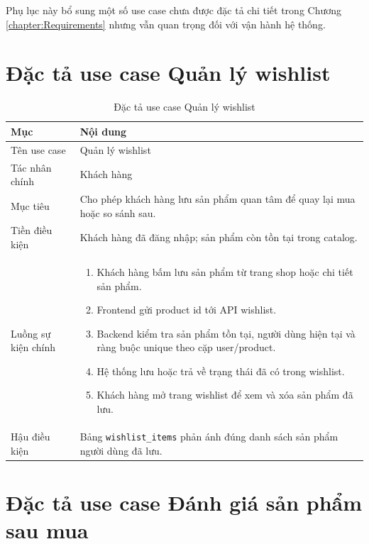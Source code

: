\documentclass[../DoAn.tex]{subfiles}
\begin{document}
Phụ lục này bổ sung một số use case chưa được đặc tả chi tiết trong Chương \ref{chapter:Requirements} nhưng vẫn quan trọng đối với vận hành hệ thống.

\section{Đặc tả use case Quản lý wishlist}
\label{appendix:B.1}

{\normalsize
\setlength{\LTleft}{\fill}
\setlength{\LTright}{\fill}
\setlength{\tabcolsep}{5pt}
\renewcommand{\arraystretch}{1.25}
\begin{longtable}{|p{3.2cm}|p{10.4cm}|}
\caption{Đặc tả use case Quản lý wishlist}\\
\hline
\textbf{Mục} & \textbf{Nội dung} \\ \hline
Tên use case & Quản lý wishlist \\ \hline
Tác nhân chính & Khách hàng \\ \hline
Mục tiêu & Cho phép khách hàng lưu sản phẩm quan tâm để quay lại mua hoặc so sánh sau. \\ \hline
Tiền điều kiện & Khách hàng đã đăng nhập; sản phẩm còn tồn tại trong catalog. \\ \hline
Luồng sự kiện chính &
\begin{minipage}[t]{10.1cm}
\begin{enumerate}[leftmargin=*,topsep=0pt,itemsep=0pt]
    \item Khách hàng bấm lưu sản phẩm từ trang shop hoặc chi tiết sản phẩm.
    \item Frontend gửi product id tới API wishlist.
    \item Backend kiểm tra sản phẩm tồn tại, người dùng hiện tại và ràng buộc unique theo cặp user/product.
    \item Hệ thống lưu hoặc trả về trạng thái đã có trong wishlist.
    \item Khách hàng mở trang wishlist để xem và xóa sản phẩm đã lưu.
\end{enumerate}
\end{minipage} \\ \hline
Hậu điều kiện & Bảng \texttt{wishlist\_items} phản ánh đúng danh sách sản phẩm người dùng đã lưu. \\ \hline
\end{longtable}
}

\section{Đặc tả use case Đánh giá sản phẩm sau mua}
\label{appendix:B.2}
\end{document}
